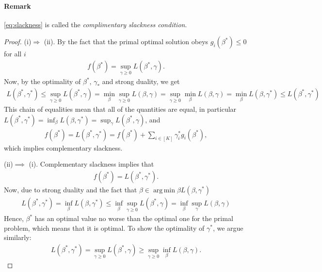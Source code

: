 \documentclass{article}
\DeclareMathOperator*{\argmin}{arg\,min}
\begin{document}
\paragraph{Remark} \eqref{eq:slackness} is called the \emph{complimentary slackness condition}.

\begin{proof}
    (i)$\Rightarrow$ (ii). By the fact that the primal optimal solution obeys $g_i(\beta^*)\leq 0$ for all $i$
    \begin{align*}
        f(\beta^*) = \sup_{\gamma\geq 0} L(\beta^*,\gamma).
    \end{align*}
    Now, by the optimality of $\beta^*$, $\gamma_*$ and strong duality, we get
    \begin{align*}
         L(\beta^*,\gamma^*) \leq \sup_{\gamma\geq 0} L(\beta^*,\gamma) = \min_{\beta} \sup_{\gamma \geq 0}L(\beta,\gamma) =  \sup_{\gamma \geq 0} \min_{\beta}L(\beta,\gamma) = \min_{\beta} L(\beta,\gamma^*) \leq L(\beta^*,\gamma^*)
    \end{align*}
    This chain of equalities mean that all of the quantities are equal, in particular $L(\beta^*,\gamma^*) = \inf_{\beta} L(\beta,\gamma^*) = \sup_\gamma L(\beta^*,\gamma)$, and
    \begin{align*}
        f(\beta^*) = L(\beta^*,\gamma^*) = f(\beta^*)+\sum_{i \in [K]} \gamma_i^*g_i(\beta^*), 
    \end{align*}
    which implies complementary slackness.

    (ii)$\implies$ (i). Complementary slackness implies that
    \begin{align*}
        f(\beta^*) = L(\beta^*,\gamma^*).
    \end{align*}
    Now, due to strong duality and the fact that $\beta \in \argmin\beta L(\beta,\gamma^*)$
    \begin{align*}
        L(\beta^*,\gamma^*) =  \inf_{\beta} L(\beta,\gamma^*)\leq \inf_\beta \sup_{\gamma\geq 0} L(\beta^*,\gamma)=  \inf_\beta \sup_\gamma L(\beta,\gamma)
    \end{align*}
Hence, $\beta^*$ has an optimal value no worse than the optimal one for the primal problem, which means that it is optimal. To show the optimality of $\gamma^*$, we argue similarly:
\begin{align*}
     L(\beta^*,\gamma^*)  = \sup_{\gamma\geq 0} L(\beta^*,\gamma) \geq \sup_{\gamma\geq 0} \inf_{\beta} L(\beta,\gamma).
\end{align*}
\end{proof}
\end{document}
